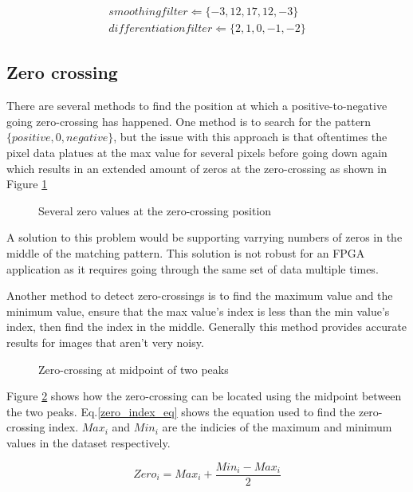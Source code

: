 \begin{equation}\label{fil_coeff}
    \begin{aligned}
        smoothing filter \Leftarrow \{ -3, 12, 17, 12, -3 \} \\
        differentiation filter \Leftarrow \{ 2, 1, 0, -1, -2 \}
    \end{aligned}
\end{equation}



\subsection{Zero crossing}

There are several methods to find the position at which a positive-to-negative going zero-crossing has happened. One method is to search for the pattern $\{ positive, 0, negative\} $, but the issue with this approach is that oftentimes the pixel data platues at the max value for several pixels before going down again which results in an extended amount of zeros at the zero-crossing as shown in Figure \ref{fig:zero_crossing_extended_zeros}

\begin{figure}[h]
    \centering
    
    \caption{Several zero values at the zero-crossing position}
    \label{fig:zero_crossing_extended_zeros}
\end{figure}

A solution to this problem would be supporting varrying numbers of zeros in the middle of the matching pattern. This solution is not robust for an FPGA application as it requires going through the same set of data multiple times.

Another method to detect zero-crossings is to find the maximum value and the minimum value, ensure that the max value's index is less than the min value's index, then find the index in the middle. Generally this method provides accurate results for images that aren't very noisy.


\begin{figure}[h]
    \centering
    
    \caption{Zero-crossing at midpoint of two peaks}
    \label{fig:zero_crossing_midpoint}
\end{figure}

Figure \ref{fig:zero_crossing_midpoint} shows how the zero-crossing can be located using the midpoint between the two peaks. Eq.\eqref{zero_index_eq} shows the equation used to find the zero-crossing index. $Max_i$ and $Min_i$ are the indicies of the maximum and minimum values in the dataset respectively.

\begin{equation}\label{zero_index_eq}
    Zero_i = Max_i + \frac{Min_i-Max_i}{2}
\end{equation}